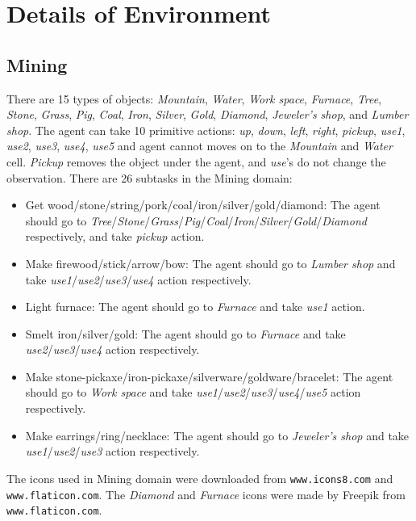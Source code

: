 \documentclass{article} \usepackage{iclr2020_conference,times}
\begin{document}
\iffalse
\section{Details of Environment}\label{sec:env}

\subsection{Mining}
There are 15 types of objects: \textit{Mountain}, \textit{Water}, \textit{Work space}, \textit{Furnace}, \textit{Tree}, \textit{Stone}, \textit{Grass}, \textit{Pig}, \textit{Coal}, \textit{Iron}, \textit{Silver}, \textit{Gold}, \textit{Diamond}, \textit{Jeweler's shop}, and \textit{Lumber shop}. The agent can take 10 primitive actions: \textit{up}, \textit{down}, \textit{left}, \textit{right}, \textit{pickup}, \textit{use1}, \textit{use2}, \textit{use3}, \textit{use4}, \textit{use5} and agent cannot moves on to the \textit{Mountain} and \textit{Water} cell. \textit{Pickup} removes the object under the agent, and \textit{use}'s do not change the observation. There are 26 subtasks in the Mining domain:
\begin{itemize}
\item Get wood/stone/string/pork/coal/iron/silver/gold/diamond: The agent should go to \textit{Tree}/\textit{Stone}/\textit{Grass}/\textit{Pig}/\textit{Coal}/\textit{Iron}/\textit{Silver}/\textit{Gold}/\textit{Diamond} respectively, and take \textit{pickup} action.
\item Make firewood/stick/arrow/bow: The agent should go to \textit{Lumber shop} and take \textit{use1}/\textit{use2}/\textit{use3}/\textit{use4} action respectively.
\item Light furnace: The agent should go to \textit{Furnace} and take \textit{use1} action.
\item Smelt iron/silver/gold: The agent should go to \textit{Furnace} and take \textit{use2}/\textit{use3}/\textit{use4} action respectively.
\item Make stone-pickaxe/iron-pickaxe/silverware/goldware/bracelet: The agent should go to \textit{Work space} and take \textit{use1}/\textit{use2}/\textit{use3}/\textit{use4}/\textit{use5} action respectively.
\item Make earrings/ring/necklace: The agent should go to \textit{Jeweler's shop} and take \textit{use1}/\textit{use2}/\textit{use3} action respectively.
\end{itemize}
The icons used in Mining domain were downloaded from \texttt{www.icons8.com} and \texttt{www.flaticon.com}. The \textit{Diamond} and \textit{Furnace} icons were made by Freepik from \texttt{www.flaticon.com}.
\end{document}
